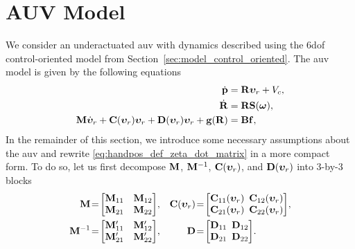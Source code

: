 \section{AUV Model}
\label{sec:handpos_def_model}

We consider an underactuated \gls{auv} with dynamics described using the 6\gls{dof} control-oriented model from Section~\ref{sec:model_control_oriented}.
The \gls{auv} model is given by the following equations
\begin{subequations}
    \begin{align}
        \dot{\mathbf{p}} &= \mathbf{R}\bm{\upsilon}_r + V_c, \\
        \dot{\mathbf{R}} &= \mathbf{R}\mathbf{S}(\bm{\omega}), \\
        \mathbf{M}\dot{\bm{\upsilon}}_r + \mathbf{C}(\bm{\upsilon}_r)\bm{\upsilon}_r + \mathbf{D}(\bm{\upsilon}_r)\bm{\upsilon}_r + \mathbf{g}(\mathbf{R}) &= \mathbf{B}\mathbf{f}, \label{eq:handpos_def_zeta_dot_matrix}
    \end{align}
\end{subequations}
In the remainder of this section, we introduce some necessary assumptions about the \gls{auv} and rewrite \eqref{eq:handpos_def_zeta_dot_matrix} in a more compact form.
To do so, let us first decompose $\mathbf{M}$, $\mathbf{M}^{-1}$, $\mathbf{C}(\bm{\upsilon}_r)$, and $\mathbf{D}(\bm{\upsilon}_r)$ into 3-by-3 blocks
\begin{subequations}
\begin{align}
    \mat{M}\! &=\! \begin{bmatrix}
        \mat{M}_{11} & \mat{M}_{12} \\ \mat{M}_{21} & \mat{M}_{22}
    \end{bmatrix}\!, &
    \mat{C}(\bvel_r)\! &=\! \begin{bmatrix}
        \mat{C}_{11}(\bvel_r)\!\!\! & \mat{C}_{12}(\bvel_r) \\ \mat{C}_{21}(\bvel_r)\!\!\! & \mat{C}_{22}(\bvel_r)
    \end{bmatrix}\!, \\
    \mat{M}^{-1}\! &=\! \begin{bmatrix}
        \mat{M}_{11}^{\prime} & \mat{M}_{12}^{\prime} \\ \mat{M}_{21}^{\prime} & \mat{M}_{22}^{\prime}
    \end{bmatrix}\!, &
    \mat{D}\! &=\! \begin{bmatrix}
        \mat{D}_{11}\!\!\! & \mat{D}_{12} \\ \mat{D}_{21}\!\!\! & \mat{D}_{22}
    \end{bmatrix}\!.
\end{align}
\end{subequations}

